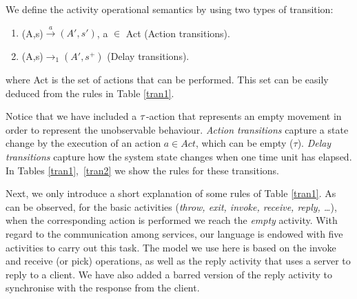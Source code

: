 \begin{definition}
We define the activity operational semantics by using two types of transition:

\begin{enumerate}
\item \hspace{0.1cm}(A,s)$\xrightarrow{a}(A',s')$, a $\in$ Act \hspace{0.3cm}(Action transitions).
\item \hspace{0.1cm}(A,s)$\xrightarrow{}_1(A',s^+)$ \hspace{1.45cm}(Delay transitions).
\end{enumerate}

\noindent where Act is the set of actions that can be performed. This set can be easily deduced from the rules in Table \ref{tran1}.
\end{definition}
Notice that we have included a ${\it \tau}$-action that represents an empty movement in order to represent the unobservable behaviour. \emph{Action transitions} capture a state change by the execution of an action $a \in Act$, which can be empty ($\tau$). \emph{Delay transitions} capture how the system state changes when one time unit has elapsed. In Tables \ref{tran1},\ \ref{tran2} we show the rules for these transitions.

Next, we only introduce a short explanation of some rules
of Table \ref{tran1}. As can be observed, for the basic
activities ({\em throw, exit, invoke, receive, reply, \ldots}), when the
corresponding action is performed we reach the {\it empty} activity. With regard to the communication among
services, our language is endowed with five activities to carry out this task. The model we use here is based on the invoke and
receive (or pick) operations, as well as the reply activity that uses a server to reply to
a client. We have also added a barred version of the reply activity to synchronise with
the response from the client.

